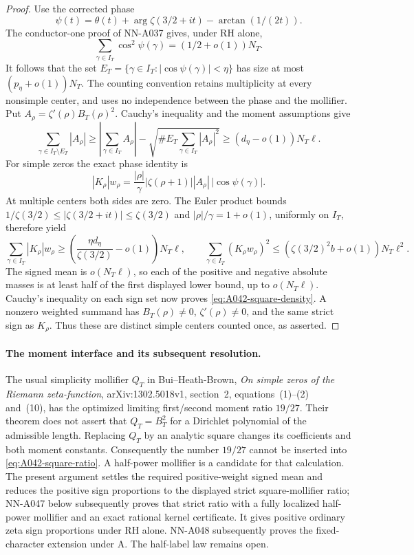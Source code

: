 \begin{proof}
Use the corrected phase
\[
 \psi(t)=\theta(t)+\arg\zeta(3/2+it)
                                     -\arctan(1/(2t)).
\]
The conductor-one proof of NN-A037 gives, under RH alone,
\[
          \sum_{\gamma\in I_T}\cos^2\psi(\gamma)
                                    =(1/2+o(1))N_T.
\]
It follows that the set \(E_T=\{\gamma\in I_T:
|\cos\psi(\gamma)|<\eta\}\) has size at most
\((p_\eta+o(1))N_T\).  The counting convention retains
multiplicity at every nonsimple center, and uses no independence between the phase
and the mollifier.  Put \(A_\rho=\zeta'(\rho)B_T(\rho)^2\).
Cauchy's inequality and the moment assumptions give
\[
 \sum_{\gamma\in I_T\setminus E_T}|A_\rho|
 \ge\left|\sum_{\gamma\in I_T}A_\rho\right|
                   -\sqrt{\#E_T\sum_{\gamma\in I_T}|A_\rho|^2}
                    \ge(d_\eta-o(1))N_T\ell.
\]
For simple zeros the exact phase identity is
\[
 |K_\rho|w_\rho
  =\frac{|\rho|}{\gamma}|\zeta(\rho+1)|
                         |A_\rho|\,|\cos\psi(\gamma)|.
\]
At multiple centers both sides are zero.  The Euler product
bounds \(1/\zeta(3/2)\le|\zeta(3/2+it)|\le\zeta(3/2)\)
and \(|\rho|/\gamma=1+o(1)\), uniformly on \(I_T\), therefore
yield
\[
 \sum_{\gamma\in I_T}|K_\rho|w_\rho
       \ge\left(\frac{\eta d_\eta}{\zeta(3/2)}-o(1)\right)
                                                    N_T\ell,
 \qquad
 \sum_{\gamma\in I_T}(K_\rho w_\rho)^2
       \le(\zeta(3/2)^2 b+o(1))N_T\ell^2.
\]
The signed mean is \(o(N_T\ell)\), so each of the positive
and negative absolute masses is at least half of the first
displayed lower bound, up to \(o(N_T\ell)\).
Cauchy's inequality on each sign set now proves
\eqref{eq:A042-square-density}.  A nonzero weighted summand
has \(B_T(\rho)\ne0\), \(\zeta'(\rho)\ne0\), and the same
strict sign as \(K_\rho\).  Thus these are distinct simple
centers counted once, as asserted.
\end{proof}

\paragraph{The moment interface and its subsequent resolution.}
The usual simplicity mollifier \(Q_T\) in Bui--Heath-Brown,
\emph{On simple zeros of the Riemann zeta-function},
arXiv:1302.5018v1, section~2, equations~(1)--(2) and~(10),
has the optimized limiting first/second moment ratio \(19/27\).
Their theorem does not assert that \(Q_T=B_T^2\) for a
Dirichlet polynomial of the admissible length.  Replacing
\(Q_T\) by an analytic square changes its coefficients
and both moment constants.  Consequently the number
\(19/27\) cannot be inserted into
\eqref{eq:A042-square-ratio}.  A half-power mollifier is a
candidate for that calculation.  The present argument settles the required
positive-weight signed mean and reduces the positive sign
proportions to the displayed strict square-mollifier ratio;
NN-A047 below subsequently proves that strict ratio with
a fully localized half-power mollifier and an exact rational
kernel certificate.  It gives positive ordinary zeta sign
proportions under RH alone.  NN-A048 subsequently proves the fixed-character extension under A.
The half-label law remains open.

